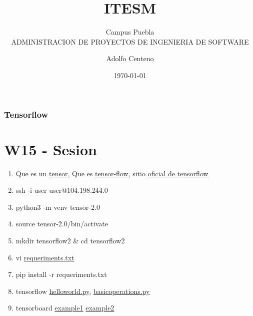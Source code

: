 \documentclass{beamer}
\begin{document}
\title{ITESM}  
\subtitle{Campus Puebla\\ADMINISTRACION DE PROYECTOS DE INGENIERIA DE SOFTWARE
}
\author{Adolfo Centeno}
\date{\today} 


\begin{frame}
\titlepage
\end{frame}

\begin{frame}\frametitle{Tensorflow}
\tableofcontents
\end{frame} 


\section{W15 - Sesion }

\begin{frame}

    
\begin{enumerate}
\item Que es un \href{https://empresas.blogthinkbig.com/deep-learning-para-todos-los-publicos/}{tensor}, Que es \href{https://www.youtube.com/watch?v=bPPLCrjQCBQ}{tensor-flow}, sitio \href{https://www.tensorflow.org/?hl=es-419}{oficial de tensorflow}
\item
  ssh -i user user@104.198.244.0

\item
  python3 -m venv tensor-2.0
  
\item
  source tensor-2.0/bin/activate
  
\item mkdir tensorflow2 \& cd tensorflow2
  
\item vi \href{https://github.com/adsoftsito/tensorflow-2.0/blob/main/requeriments.txt}{requeriments.txt}

\item pip install -r requeriments.txt
   
\item tensorflow \href{https://github.com/adsoftsito/tensorflow-2.0/blob/main/hello_world.py}{helloworld.py},  \href{https://github.com/adsoftsito/tensorflow-2.0/blob/main/tensor_operations.py}{basicoperations.py}

\item tensorboard \href{https://github.com/adsoftsito/tensorflow-2.0/blob/main/tensorboard_example.py}{example1} \href{https://gist.github.com/EvolvedSquid/0b9e031af5b69d15f073e99bb9c69a4b}{example2}


\end{enumerate}
\end{frame}
\end{document}
